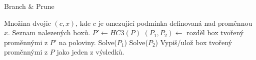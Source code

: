 \begin{algorithm}
\caption{Branch \& Prune}
\label{BranchPrune}
\begin{algorithmic}[1]
\Require Množina dvojic $(c, x)$, kde $c$ je omezující podmínka definovaná nad proměnnou $x$.
\Ensure Seznam nalezených boxů.
\State $P' \gets HC3(P)$
\State $(P_1, P_2) \gets $ rozděl box tvořený proměnnými z $P'$ na poloviny.
\State Solve($P_1$)
\State Solve($P_2$)
\Else
\State Vypiš/ulož box tvořený proměnnými z $P$ jako jeden z výsledků.
\EndIf
\EndProcedure
\end{algorithmic}
\end{algorithm}
